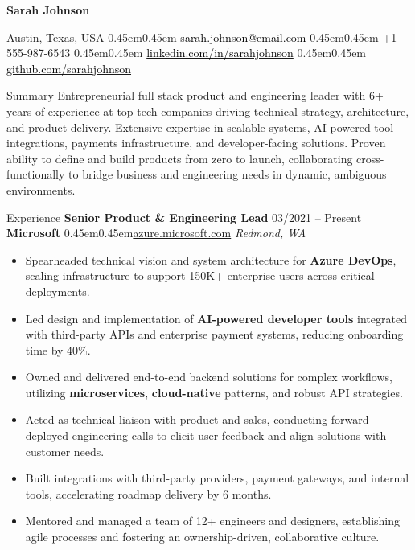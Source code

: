 \documentclass[10pt, letterpaper]{article}
\makeatletter
\renewcommand{\section}{%
  \@startsection{section}{1}{\z@}{10pt}{6pt}{%
    \Large\bfseries\color{black}%
  }%
}
\newcommand{\bull}{\kern0.45em\textbullet\kern0.45em}
\newcommand{\role}[1]{\textbf{#1}}
\newcommand{\org}[1]{\textbf{#1}}
\newcommand{\place}[1]{\textit{#1}}
\newcommand{\blackLink}[2]{\href{#1}{\textcolor{black}{#2}}}
\renewcommand{\maketitle}{
  \begin{center}
    {\huge\bfseries Sarah Johnson}\par\vspace{6pt}
    {\color{Primary}
      Austin, Texas, USA \bull
      \blackLink{mailto:sarah.johnson@email.com}{sarah.johnson@email.com} \bull
      +1-555-987-6543 \bull
      \blackLink{https://linkedin.com/in/sarahjohnson}{linkedin.com/in/sarahjohnson} \bull
      \blackLink{https://github.com/sarahjohnson}{github.com/sarahjohnson}
    }
  \end{center}
  \vspace{-8pt}
}
\makeatother
\begin{document}
\maketitle
\vspace{15pt}

\section{Summary}
Entrepreneurial full stack product and engineering leader with 6+ years of experience at top tech companies driving technical strategy, architecture, and product delivery. Extensive expertise in scalable systems, AI-powered tool integrations, payments infrastructure, and developer-facing solutions. Proven ability to define and build products from zero to launch, collaborating cross-functionally to bridge business and engineering needs in dynamic, ambiguous environments.

\section{Experience}
\role{Senior Product \& Engineering Lead} \hfill 03/2021 -- Present \\
\org{Microsoft} \bull \href{https://azure.microsoft.com}{azure.microsoft.com} \hfill \place{Redmond, WA}
\begin{itemize}
  \item Spearheaded technical vision and system architecture for \textbf{Azure DevOps}, scaling infrastructure to support 150K+ enterprise users across critical deployments.
  \item Led design and implementation of \textbf{AI-powered developer tools} integrated with third-party APIs and enterprise payment systems, reducing onboarding time by 40\%.
  \item Owned and delivered end-to-end backend solutions for complex workflows, utilizing \textbf{microservices}, \textbf{cloud-native} patterns, and robust API strategies.
  \item Acted as technical liaison with product and sales, conducting forward-deployed engineering calls to elicit user feedback and align solutions with customer needs.
  \item Built integrations with third-party providers, payment gateways, and internal tools, accelerating roadmap delivery by 6 months.
  \item Mentored and managed a team of 12+ engineers and designers, establishing agile processes and fostering an ownership-driven, collaborative culture.
\end{itemize}
\vspace{12pt}
\end{document}
